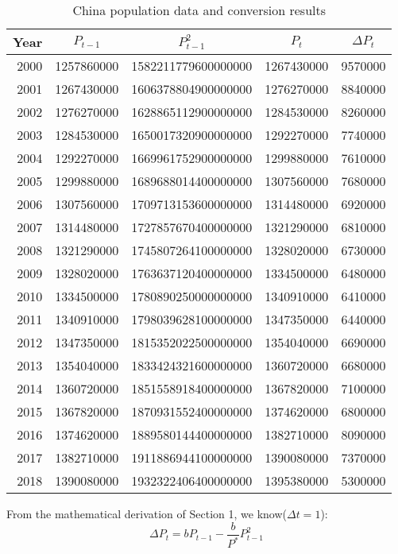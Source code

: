 \documentclass[12pt]{article}  %
\begin{document}
\begin{table}[H]
	\centering
	\caption{China population data and conversion results}
	\begin{tabular}{rrrrr}
		\toprule
		\multicolumn{1}{c}{Year} & \multicolumn{1}{c}{${P_{t-1}}$} & \multicolumn{1}{c}{${P_{t-1}^{2}}$} & \multicolumn{1}{c}{${P_{t}}$} & \multicolumn{1}{c}{${\Delta P_{t}}$} \\
		\midrule
		2000  & 1257860000 & 1582211779600000000  & 1267430000 & 9570000 \\
		2001  & 1267430000 & 1606378804900000000  & 1276270000 & 8840000 \\
		2002  & 1276270000 & 1628865112900000000  & 1284530000 & 8260000 \\
		2003  & 1284530000 & 1650017320900000000  & 1292270000 & 7740000 \\
		2004  & 1292270000 & 1669961752900000000  & 1299880000 & 7610000 \\
		2005  & 1299880000 & 1689688014400000000  & 1307560000 & 7680000 \\
		2006  & 1307560000 & 1709713153600000000  & 1314480000 & 6920000 \\
		2007  & 1314480000 & 1727857670400000000  & 1321290000 & 6810000 \\
		2008  & 1321290000 & 1745807264100000000  & 1328020000 & 6730000 \\
		2009  & 1328020000 & 1763637120400000000  & 1334500000 & 6480000 \\
		2010  & 1334500000 & 1780890250000000000  & 1340910000 & 6410000 \\
		2011  & 1340910000 & 1798039628100000000  & 1347350000 & 6440000 \\
		2012  & 1347350000 & 1815352022500000000  & 1354040000 & 6690000 \\
		2013  & 1354040000 & 1833424321600000000  & 1360720000 & 6680000 \\
		2014  & 1360720000 & 1851558918400000000  & 1367820000 & 7100000 \\
		2015  & 1367820000 & 1870931552400000000  & 1374620000 & 6800000 \\
		2016  & 1374620000 & 1889580144400000000  & 1382710000 & 8090000 \\
		2017  & 1382710000 & 1911886944100000000  & 1390080000 & 7370000 \\
		2018  & 1390080000 & 1932322406400000000  & 1395380000 & 5300000 \\
	\end{tabular}%
	\label{tab:china_data}%
\end{table}%
From the mathematical derivation of Section 1, we know(${\Delta t=1}$):
\begin{equation}
	{\Delta P_{t}=b P_{t-1}-\frac{b}{P^{*}} P_{t-1}^{2}}
\end{equation}
\end{document}
